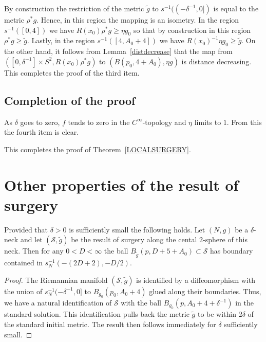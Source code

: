  By
construction the restriction of the metric $\widetilde g$ to
$s^{-1}((-\delta^{-1},0])$ is equal to the metric $\rho^*g$. Hence,
in this region the mapping  is an isometry. In the region
$s^{-1}([0,4])$ we have $R(x_0)\rho^*g\ge \eta g_0$ so that by
construction in this region $\rho^*g\ge \tilde g$. Lastly, in the
region $s^{-1}([4,A_0+4])$ we have $R(x_0)^{-1}\eta g_0\ge \tilde
g$. On the other hand, it follows from Lemma~\ref{distdecrease} that
the map from $([0,\delta^{-1}]\times S^2,R(x_0)\rho^* g)$ to
$(B(p_0,4+A_0),\eta g)$ is distance decreasing. This completes the
proof of the third item.

\subsection{Completion of the proof}

As $\delta$ goes to zero,  $f$ tends to zero in the
$C^\infty$-topology and $\eta$ limits to $1$. From this  the fourth
item is clear.

This completes the proof of Theorem~\ref{LOCALSURGERY}.


\section{Other properties of the result of surgery}

\begin{lemma}
\label{lem:surgery-result-metric-ball-bounds}\label{stdballs}
Provided that $\delta>0$ is sufficiently small the following holds. Let $(N,g)$
be a $\delta$-neck and let $({\mathcal S},\tilde g)$ be the result of surgery
along the cental $2$-sphere of this neck. Then for any $0<D<\infty$ the ball
$B_{\tilde g}(p,D+5+A_0)\subset {\mathcal S}$ has boundary contained in
$s_N^{-1}(-(2D+2),-D/2)$.
\end{lemma}


\begin{proof}
The Riemannian manifold $({\mathcal S},\tilde g)$ is identified by a
diffeomorphism with the union of $s_{N}^{-1}(-\delta^{-1},0]$ to
$B_{g_0}(p_0,A_0+4)$ glued along their boundaries. Thus, we have a natural
identification of ${\mathcal S}$ with the ball $B_{g_0}(p,A_0+4+\delta^{-1})$
in the standard solution. This identification pulls back the metric $\tilde g$
to be within $2\delta$ of the standard initial metric. The result then follows
immediately for $\delta$ sufficiently small.
\end{proof}

